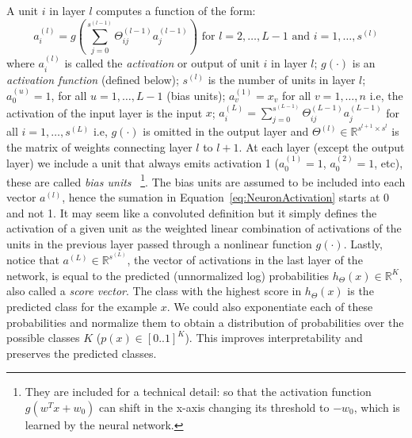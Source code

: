 A unit $i$ in layer $l$ computes a function of the form:
\begin{equation}
	a^{(l)}_i = g \left(\sum_{j=0}^{s^{(l-1)}} \Theta^{(l-1)}_{ij}a_j^{(l-1)}\right) \text{ for $l= 2,\dots,L-1$ and $i = 1,\dots,s^{(l)}$}
	\label{eq:NeuronActivation}
\end{equation}
where $a^{(l)}_i$ is called the \emph{activation} or output of unit $i$ in layer $l$;
$g(\cdot)$ is an \emph{activation function} (defined below);
$s^{(l)}$ is the number of units in layer $l$;
$a^{(u)}_0 = 1$, for all $u = 1, \ldots, L-1$ (bias units);
$a^{(1)}_v = x_v$ for all $v = 1, \ldots, n$ i.e, the activation of the input layer is the input $x$;
$a^{(L)}_i = \sum_{j=0}^{s^{(L-1)}} \Theta^{(L-1)}_{ij}a_j^{(L-1)}$ for all $i = 1,\dots,s^{(L)}$ i.e, $g(\cdot)$ is omitted in the output layer
and $\Theta^{(l)} \in \mathbb{R}^{s^{l+1} \times s^{l}} $ is the matrix of weights connecting layer $l$ to $l+1$. At each layer (except the output layer) we include a unit that always emits activation 1 ($a^{(1)}_0 = 1$, $a^{(2)}_0 = 1$, etc), these are called \emph{bias units}~
\footnote{They are included for a technical detail: so that the activation function $g(w^Tx+w_0)$ can shift in the x-axis changing its threshold to $-w_0$, which is learned by the neural network.}. 
The bias units are assumed to be included into each vector $a^{(l)}$, hence the sumation in Equation~\ref{eq:NeuronActivation} starts at 0 and not 1. It may seem like a convoluted definition but it simply defines the activation of a given unit as the weighted linear combination of activations of the units in the previous layer passed through a nonlinear function $g(\cdot)$.
Lastly, notice that $a^{(L)} \in \mathbb{R}^{s^{(L)}}$, the vector of activations in the last layer of the network, is equal to the predicted (unnormalized log) probabilities $h_\Theta(x) \in \mathbb{R}^K$, also called a \emph{score vector}. The class with the highest score in $h_\Theta(x)$ is the predicted class for the example $x$. We could also exponentiate each of these probabilities and normalize them to obtain a distribution of probabilities over the possible classes $K$ ($p(x) \in [0..1]^K$). This improves interpretability and preserves the predicted classes.

